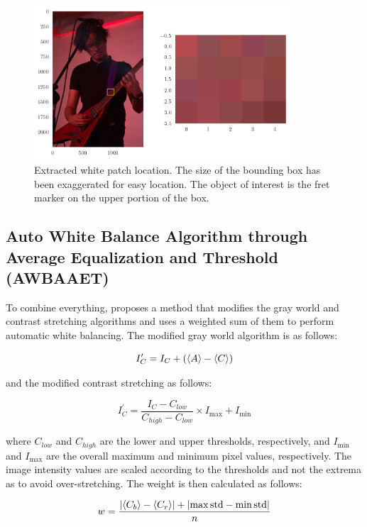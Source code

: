 \documentclass[12pt,a4paper]{article}
\begin{document}
\begin{figure}[htb]
	\centering
	\includegraphics[width=0.85\textwidth]{patch.png}
	\caption{Extracted white patch location. The size of the bounding box has been exaggerated for easy location. The object of interest is the fret marker on the upper portion of the box.}
	\label{fig:patch}
\end{figure}

\subsection{Auto White Balance Algorithm through Average Equalization and Threshold (AWBAAET)}
To combine everything, \citep{awbaet} proposes a method that modifies the gray world and contrast stretching algorithms and uses a weighted sum of them to perform automatic white balancing. The modified gray world algorithm is as follows:

\begin{equation}\label{eq:gw-mod}
	I_C^\prime = I_C + (\ev{A} - \ev{C})
\end{equation}

and the modified contrast stretching as follows:

\begin{equation}\label{eq:cs-mod}
	I_C^\prime = \frac{I_C - C_{low}}{C_{high} - C_{low}} \times I_{\max} + I_{\min}
\end{equation}

\noindent
where $C_{low}$ and $C_{high}$ are the lower and upper thresholds, respectively, and $I_{\min}$ and $I_{\max}$ are the overall maximum and minimum pixel values, respectively. The image intensity values are scaled according to the thresholds and not the extrema as to avoid over-stretching. The weight is then calculated as follows:

\begin{equation}\label{eq:weights}
	w = \frac{\abs{\ev{C_b} - \ev{C_r}} + \abs{\max{\textrm{std}} - \min{\textrm{std}}}}{n}
\end{equation}
\end{document}
